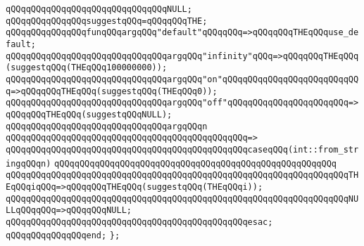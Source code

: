 \verb|qQQqqQQqqQQqqQQqqQQqqQQqqQQqqQQqNULL;|\newline
\newline
\verb|qQQqqQQqqQQqqQQqsuggestqQQq=qQQqqQQqTHE;|\newline
\newline
\verb|qQQqqQQqqQQqqQQqfunqQQqargqQQq"default"qQQqqQQq=>qQQqqQQqTHEqQQquse_default;|\newline
\verb|qQQqqQQqqQQqqQQqqQQqqQQqqQQqqQQqargqQQq"infinity"qQQq=>qQQqqQQqTHEqQQq(suggestqQQq(THEqQQq100000000));|\newline
\verb|qQQqqQQqqQQqqQQqqQQqqQQqqQQqqQQqargqQQq"on"qQQqqQQqqQQqqQQqqQQqqQQqqQQq=>qQQqqQQqTHEqQQq(suggestqQQq(THEqQQq0));|\newline
\verb|qQQqqQQqqQQqqQQqqQQqqQQqqQQqqQQqargqQQq"off"qQQqqQQqqQQqqQQqqQQqqQQq=>qQQqqQQqTHEqQQq(suggestqQQqNULL);|\newline
\newline
\verb|qQQqqQQqqQQqqQQqqQQqqQQqqQQqqQQqargqQQqn|\newline
\verb|qQQqqQQqqQQqqQQqqQQqqQQqqQQqqQQqqQQqqQQqqQQqqQQq=>|\newline
\verb|qQQqqQQqqQQqqQQqqQQqqQQqqQQqqQQqqQQqqQQqqQQqqQQqcaseqQQq(int::from_stringqQQqn)|\newline
\verb|qQQqqQQqqQQqqQQqqQQqqQQqqQQqqQQqqQQqqQQqqQQqqQQqqQQqqQQq|\newline
\verb|qQQqqQQqqQQqqQQqqQQqqQQqqQQqqQQqqQQqqQQqqQQqqQQqqQQqqQQqqQQqqQQqqQQqTHEqQQqiqQQq=>qQQqqQQqTHEqQQq(suggestqQQq(THEqQQqi));|\newline
\verb|qQQqqQQqqQQqqQQqqQQqqQQqqQQqqQQqqQQqqQQqqQQqqQQqqQQqqQQqqQQqqQQqqQQqNULLqQQqqQQq=>qQQqqQQqNULL;|\newline
\verb|qQQqqQQqqQQqqQQqqQQqqQQqqQQqqQQqqQQqqQQqqQQqqQQqesac;|\newline
\verb|qQQqqQQqqQQqqQQqend;|\newline
\verb|};|\newline

